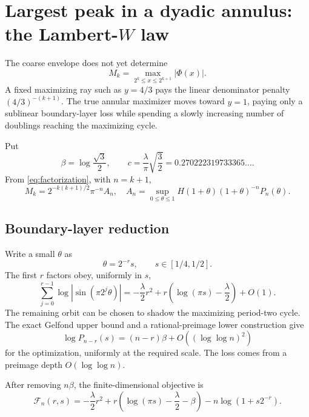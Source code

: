 \documentclass[11pt,oneside]{article}
\theoremstyle{definition}
\theoremstyle{remark}
\begin{document}
\section{Largest peak in a dyadic annulus: the Lambert-\texorpdfstring{\(W\)}{W} law}
\label{sec:annular}

The coarse envelope does not yet determine
\[
 M_k=\max_{2^k\le x\le2^{k+1}}|\Phi(x)|.
\]
A fixed maximizing ray such as \(y=4/3\) pays the linear denominator penalty
\((4/3)^{-(k+1)}\).  The true annular maximizer moves toward \(y=1\), paying
only a sublinear boundary-layer loss while spending a slowly increasing number
of doublings reaching the maximizing cycle.

Put
\begin{equation}
 \beta=\log\frac{\sqrt3}{2},
 \qquad
 c=\frac{\lambda}{\pi}\sqrt{\frac32}
 =0.270222319733365\ldots .
 \label{eq:beta-c}
\end{equation}
From \eqref{eq:factorization}, with \(n=k+1\),
\begin{equation}
 M_k=2^{-k(k+1)/2}\pi^{-n}A_n,
 \quad
 A_n=\sup_{0\le\theta\le1}
 H(1+\theta)(1+\theta)^{-n}P_n(\theta).
 \label{eq:M-A}
\end{equation}

\subsection{Boundary-layer reduction}

Write a small \(\theta\) as
\[
 \theta=2^{-r}s,
 \qquad s\in[1/4,1/2].
\]
The first \(r\) factors obey, uniformly in \(s\),
\begin{equation}
 \sum_{j=0}^{r-1}\log|\sin(\pi2^j\theta)|
 =-\frac\lambda2r^2+r\left(\log(\pi s)-\frac\lambda2\right)+O(1).
 \label{eq:small-block}
\end{equation}
The remaining orbit can be chosen to shadow the maximizing period-two cycle.
The exact Gelfond upper bound and a rational-preimage lower construction give
\begin{equation}
 \log P_{n-r}(s)=(n-r)\beta+O((\log\log n)^2)
 \label{eq:tail-max}
\end{equation}
for the optimization, uniformly at the required scale.  The loss comes from a
preimage depth \(O(\log\log n)\).

After removing \(n\beta\), the finite-dimensional objective is
\begin{equation}
 \mathcal F_n(r,s)
 =-\frac\lambda2r^2
 +r\left(\log(\pi s)-\frac\lambda2-\beta\right)
 -n\log(1+s2^{-r}).
 \label{eq:F-objective}
\end{equation}
\end{document}
